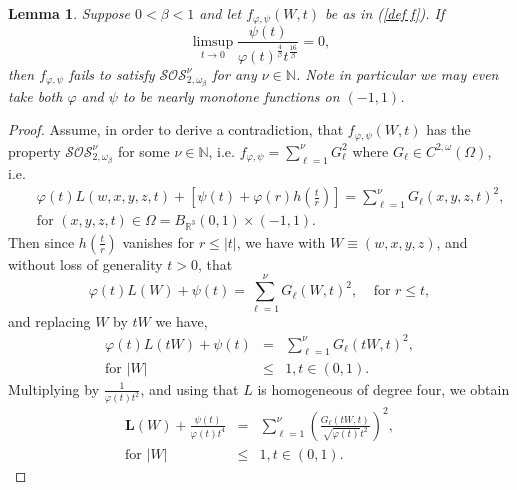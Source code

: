 \documentclass{amsart}
\theoremstyle{plain}
\newtheorem{lemma}[theorem]{Lemma}
\numberwithin{equation}{section}
\begin{document}
\begin{lemma}
\label{failure}Suppose $0<\beta <1$ and let $f_{\varphi ,\psi }\left(
W,t\right) $ be as in (\ref{def f}). If 
\begin{equation}
\limsup_{t\rightarrow 0}\frac{\psi \left( t\right) }{\varphi \left( t\right)
^{\frac{4}{\beta }}t^{\frac{16}{\beta }}}=0,  \label{contra}
\end{equation}%
then $f_{\varphi ,\psi }$ fails to satisfy $\mathcal{SOS}_{2,\omega _{\beta
}}^{\nu }$ for any $\nu \in \mathbb{N}$. Note in particular we may even take
both $\varphi $ and $\psi $ to be nearly monotone functions on $\left(
-1,1\right) $.
\end{lemma}

\begin{proof}
Assume, in order to derive a contradiction, that $f_{\varphi ,\psi }\left(
W,t\right) $ has the property $\mathcal{SOS}_{2,\omega _{\beta }}^{\nu }$
for some $\nu \in \mathbb{N}$, i.e. $f_{\varphi ,\psi }=\sum_{\ell =1}^{\nu
}G_{\ell }^{2}$ where $G_{\ell }\in C^{2,\omega }\left( \Omega \right) $,
i.e.%
\begin{eqnarray*}
&&\varphi \left( t\right) L\left( w,x,y,z,t\right) +\left[ \psi \left(
t\right) +\varphi \left( r\right) h\left( \frac{t}{r}\right) \right]
=\sum_{\ell =1}^{\nu }G_{\ell }\left( x,y,z,t\right) ^{2}, \\
&&\text{for }\left( x,y,z,t\right) \in \Omega =B_{\mathbb{R}^{3}}\left(
0,1\right) \times \left( -1,1\right) .
\end{eqnarray*}%
Then since $h\left( \frac{t}{r}\right) $ vanishes for $r\leq \left\vert
t\right\vert $, we have with $W\equiv \left( w,x,y,z\right) $, and without
loss of generality $t>0$, that%
\begin{equation*}
\varphi \left( t\right) L\left( W\right) +\psi \left( t\right) =\sum_{\ell
=1}^{\nu }G_{\ell }\left( W,t\right) ^{2},\ \ \ \ \ \text{for }r\leq t,
\end{equation*}%
and replacing $W$ by $tW$ we have, 
\begin{eqnarray*}
\varphi \left( t\right) L\left( tW\right) +\psi \left( t\right)
&=&\sum_{\ell =1}^{\nu }G_{\ell }\left( tW,t\right) ^{2}, \\
\text{for }\left\vert W\right\vert &\leq &1,t\in \left( 0,1\right) .
\end{eqnarray*}%
Multiplying by $\frac{1}{\varphi \left( t\right) t^{2}}$, and using that $L$
is homogeneous of degree four, we obtain%
\begin{eqnarray*}
\mathbf{L}\left( W\right) +\frac{\psi \left( t\right) }{\varphi \left(
t\right) t^{4}} &=&\sum_{\ell =1}^{\nu }\left( \frac{G_{\ell }\left(
tW,t\right) }{\sqrt{\varphi \left( t\right) }t^{2}}\right) ^{2}, \\
\text{for }\left\vert W\right\vert &\leq &1,t\in \left( 0,1\right) .
\end{eqnarray*}


\end{proof}
\end{document}
